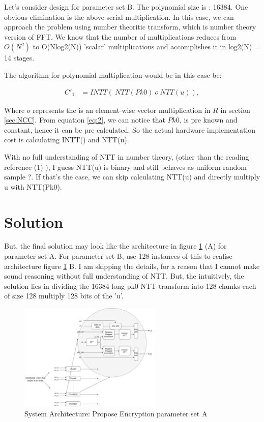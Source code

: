\documentclass{article}
\begin{document}
Let's consider design for parameter set B. The polynomial size is : 16384. One obvious elimination is the above serial multiplication. In this case, we can approach the problem using number theoritic transform, which is number theory version of FFT. We know that the number of multiplications reduces from $O(N^2)$ to O(Nlog2(N)) 'scalar' multiplications and accomplishes it in log2(N) = 14 stages.

    The algorithm for polynomial multiplication would be in this case be: 

    \begin{align} 
      C'_1 &= INTT(\ NTT(Pk0)\ o\ NTT(u) ), \label{eq:2}
    \end{align}

    Where $o$ represents the is an element-wise vector multiplication in $R$ in section \ref{sec:NCC}. From equation \ref{eq:2}, we can notice that $Pk0$, is pre known and constant, hence it can be pre-calculated. So the actual hardware implementation cost is calculating INTT() and NTT(u). 

With no full understanding of NTT in number theory,  (other than  the reading reference (1) ), I guess NTT(u) is binary and still behaves as  uniform random sample ?. If that's the case, we can skip calculating NTT(u) and directly multiply u with NTT(Pk0).  

\section{Solution}
But, the final solution may look like the architecture in figure \ref{fig:param_enc_AB} (A) for parameter set A.  For parameter set B,  use 128 instances of this to realise architecture figure \ref{fig:param_enc_AB} B. I am skipping the details, for a reason that I cannot make sound reasoning without full understanding of NTT. But, the intuitively, the solution lies in dividing the 16384 long pk0 NTT transform into 128 chunks each of size 128 multiply 128 bits of the 'u'.

    \begin{figure}[htp] 
      \centering
      \includegraphics[width=0.6\textwidth]{enc_param_ab.png}
      \caption{System Architecture: Propose Encryption parameter set A}
      \label{fig:param_enc_AB} 
    \end{figure}
\end{document}
